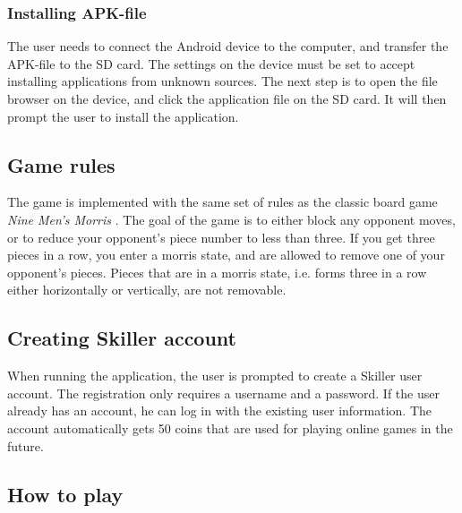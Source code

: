 \subsubsection{Installing APK-file}
The user needs to connect the Android device to the computer, and transfer the APK-file to the SD card. The settings on the device must be set to accept installing applications from unknown sources. The next step is to open the file browser on the device, and click the application file on the SD card. It will then prompt the user to install the application.

\subsection{Game rules}
The game is implemented with the same set of rules as the classic board game \emph{Nine Men's Morris} \cite{morris}. The goal of the game is to either block any opponent moves, or to reduce your opponent's piece number to less than three. If you get three pieces in a row, you enter a morris state, and are allowed to remove one of your opponent's pieces. Pieces that are in a morris state, i.e. forms three in a row either horizontally or vertically, are not removable.

\subsection{Creating Skiller account}
When running the application, the user is prompted to create a Skiller user account. The registration only requires a username and a password. If the user already has an account, he can log in with the existing user information. The account automatically gets 50 coins that are used for playing online games in the future.

\subsection{How to play}
\label{section:playing}

